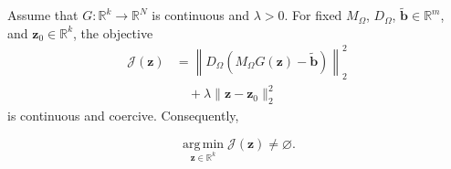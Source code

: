 \begin{proposition}
\label{prop:existence}
Assume that $G:\mathbb{R}^{k}\rightarrow\mathbb{R}^{N}$ is continuous and
$\lambda>0$. For fixed $M_{\Omega}$, $D_{\Omega}$,
$\widetilde{\boldsymbol{b}}\in\mathbb{R}^{m}$, and
$\boldsymbol{z}_0\in\mathbb{R}^{k}$, the objective
\begin{equation*}
\begin{aligned}
\mathcal{J}(\boldsymbol{z})
&=
\left\|
D_{\Omega}
\left(
M_{\Omega}G(\boldsymbol{z})
-
\widetilde{\boldsymbol{b}}
\right)
\right\|_2^2
\\
&\quad
+
\lambda\|\boldsymbol{z}-\boldsymbol{z}_0\|_2^2
\end{aligned}
\end{equation*}
is continuous and coercive. Consequently,

\begin{equation}
\operatorname*{arg\,min}_{\boldsymbol{z}\in\mathbb{R}^{k}}
\mathcal{J}(\boldsymbol{z})
\neq
\varnothing.
\label{eq:existence_argmin}
\end{equation}
\end{proposition}

